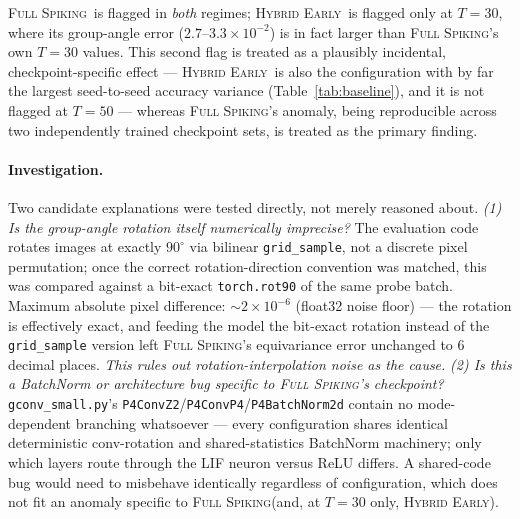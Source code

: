 \documentclass[11pt]{article}
\newcommand{\FullSpiking}{\textsc{Full Spiking}}
\newcommand{\HybridEarly}{\textsc{Hybrid Early}}
\begin{document}
\noindent \FullSpiking\ is flagged in \emph{both} regimes; \HybridEarly\ is flagged only at $T=30$,
where its group-angle error ($2.7$--$3.3\times10^{-2}$) is in fact larger than \FullSpiking's own
$T=30$ values. This second flag is treated as a plausibly incidental, checkpoint-specific effect ---
\HybridEarly\ is also the configuration with by far the largest seed-to-seed accuracy variance
(Table~\ref{tab:baseline}), and it is not flagged at $T=50$ --- whereas \FullSpiking's anomaly, being
reproducible across two independently trained checkpoint sets, is treated as the primary finding.

\paragraph{Investigation.} Two candidate explanations were tested directly, not merely reasoned about.
\emph{(1) Is the group-angle rotation itself numerically imprecise?} The evaluation code rotates
images at exactly $90^\circ$ via bilinear \texttt{grid\_sample}, not a discrete pixel permutation; once
the correct rotation-direction convention was matched, this was compared against a bit-exact
\texttt{torch.rot90} of the same probe batch. Maximum absolute pixel difference: $\sim 2\times10^{-6}$
(float32 noise floor) --- the rotation is effectively exact, and feeding the model the bit-exact
rotation instead of the \texttt{grid\_sample} version left \FullSpiking's equivariance error unchanged
to 6 decimal places. \emph{This rules out rotation-interpolation noise as the cause.} \emph{(2) Is this
a BatchNorm or architecture bug specific to \FullSpiking's checkpoint?} \texttt{gconv\_small.py}'s
\texttt{P4ConvZ2}/\texttt{P4ConvP4}/\texttt{P4BatchNorm2d} contain no mode-dependent branching
whatsoever --- every configuration shares identical deterministic conv-rotation and shared-statistics
BatchNorm machinery; only which layers route through the LIF neuron versus ReLU differs. A shared-code
bug would need to misbehave identically regardless of configuration, which does not fit an anomaly
specific to \FullSpiking (and, at $T=30$ only, \HybridEarly).
\end{document}
